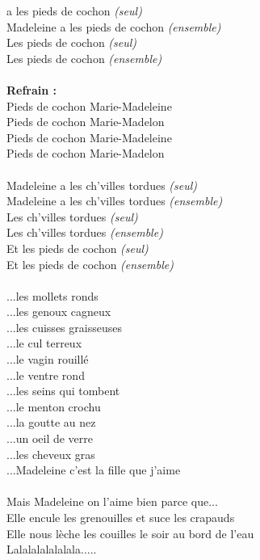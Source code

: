 
 a les pieds de cochon \textit{(seul)}
\\Madeleine a les pieds de cochon \textit{(ensemble)}
\\Les pieds de cochon \textit{(seul)}
\\Les pieds de cochon \textit{(ensemble)}
\\\\\textbf{Refrain :}
\\Pieds de cochon Marie-Madeleine
\\Pieds de cochon Marie-Madelon
\\Pieds de cochon Marie-Madeleine
\\Pieds de cochon Marie-Madelon
\\\\Madeleine a les ch'villes tordues \textit{(seul)}
\\Madeleine a les ch'villes tordues \textit{(ensemble)}
\\Les ch'villes tordues \textit{(seul)}
\\Les ch'villes tordues \textit{(ensemble)}
\\Et les pieds de cochon \textit{(seul)}
\\Et les pieds de cochon \textit{(ensemble)}
\\\\...les mollets ronds
\\...les genoux cagneux
\\...les cuisses graisseuses
\\...le cul terreux
\\...le vagin rouillé
\\...le ventre rond
\\...les seins qui tombent
\\...le menton crochu
\\...la goutte au nez
\\...un oeil de verre
\\...les cheveux gras
\\...Madeleine c'est la fille que j'aime
\\\\Mais Madeleine on l'aime bien parce que...
\\Elle encule les grenouilles et suce les crapauds
\\Elle nous lèche les couilles le soir au bord de l'eau
\\Lalalalalalalala.....

\breakpage